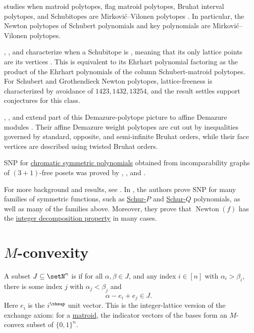 studies when matroid polytopes, flag matroid polytopes,
Bruhat interval polytopes, and Schubitopes are Mirković--Vilonen polytopes
\cite{Sanchez2023x}.  In particular, the Newton polytopes of Schubert
polynomials and key polynomials are Mirković--Vilonen polytopes.

, , and  characterize
when a Schubitope is , meaning that its only lattice
points are its vertices \cite{DouFanLiu2026x}.  This is equivalent to its
Ehrhart polynomial factoring as the product of the Ehrhart polynomials of the
column Schubert-matroid polytopes.  For Schubert and Grothendieck Newton
polytopes, lattice-freeness is characterized by avoidance of
$1423,1432,13254$, and the result settles support conjectures for this class.

, , and  extend part
of this Demazure-polytope picture to affine Demazure modules
\cite{BessonJeraldsKiers2024x}.  Their affine Demazure weight polytopes are
cut out by inequalities governed by standard, opposite, and semi-infinite
Bruhat orders, while their face vertices are described using twisted Bruhat
orders.

SNP for \hyperref[chromaticQuasisymmetric]{chromatic symmetric polynomials}
obtained from incomparability graphs of $(3+1)$-free posets was proved by
, , and
 \cite{MatherneMoralesSelover2022x}.

For more background and results, see \cite{WangZhangZhang2024x}.
In \cite{NguyenNgocTuanHai2023}, the authors prove SNP for many families of
symmetric functions, such as \hyperref[schurP]{Schur-$P$} and
\hyperref[schurQ]{Schur-$Q$} polynomials, as well as many of the families
above.  Moreover, they prove that $\operatorname{Newton}(f)$ has the
\hyperref[polytopeIDP]{integer decomposition property} in many cases.


\section[MConvexity]{$M$-convexity}

A subset $J\subseteq\setN^n$ is \label{mConvexSet} if for
all $\alpha,\beta\in J$, and any index $i\in[n]$ with
$\alpha_i>\beta_i$, there is some index $j$ with $\alpha_j<\beta_j$ and
\[
  \alpha-e_i+e_j\in J.
\]
Here $e_i$ is the $i^\thsup$ unit vector.  This is the integer-lattice version
of the exchange axiom: for a \hyperref[matroid]{matroid}, the indicator
vectors of the bases form an $M$-convex subset of $\{0,1\}^n$.

